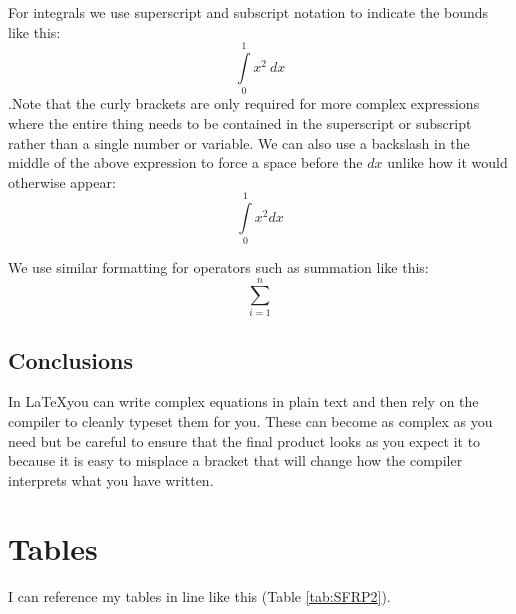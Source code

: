 \documentclass[12pt]{article}
\begin{document}
For integrals we use superscript and subscript notation to indicate the bounds like this:  \[ \int\limits_{0}^{1} x^2 \ dx \].Note that the curly brackets are only required for more complex expressions where the entire thing needs to be contained in the superscript or subscript rather than a single number or variable. We can also use a backslash in the middle of the above expression to force a space before the $dx$ unlike how it would otherwise appear: \[ \int\limits_{0}^{1} x^2 dx \]

We use similar formatting for operators such as summation like this:
\[\sum_{i = 1}^{n}\]

\subsection{Conclusions}

In \LaTeX you can write complex equations in plain text and then rely on the compiler to cleanly typeset them for you. These can become as complex as you need but be careful to ensure that the final product looks as you expect it to because it is easy to misplace a bracket that will change how the compiler interprets what you have written.

\newpage
\section{Tables}

I can reference my tables in line like this (Table \ref{tab:SFRP2}).
\end{document}

